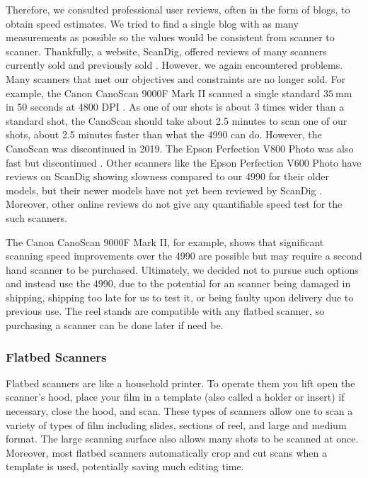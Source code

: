 \documentclass[12pt]{article} %
\begin{document}
Therefore, we consulted professional user reviews, often in the form of blogs, to obtain speed estimates. We tried to find a single blog with as many measurements as possible so the values would be consistent from scanner to scanner. Thankfully, a website, ScanDig, offered reviews of many scanners currently sold and previously sold \cite{ScanDig}. However, we again encountered problems. Many scanners that met our objectives and constraints are no longer sold. For example, the Canon CanoScan 9000F Mark II scanned a single standard $35 \ \text{mm}$ in 50 seconds at 4800 DPI \cite{canoscanspeed}. As one of our shots is about 3 times wider than a standard shot, the CanoScan should take about 2.5 minutes to scan one of our shots, about 2.5 minutes faster than what the 4990 can do. However, the CanoScan was discontinued in 2019. The Epson Perfection V800 Photo was also fast but discontinued \cite{v800scandig}. Other scanners like the Epson Perfection V600 Photo have reviews on ScanDig showing slowness compared to our 4990 for their older models, but their newer models have not yet been reviewed by ScanDig \cite{v600scandig}. Moreover, other online reviews do not give any quantifiable speed test for the such scanners.

The Canon CanoScan 9000F Mark II, for example, shows that significant scanning speed improvements over the 4990 are possible but may require a second hand scanner to be purchased. Ultimately, we decided not to pursue such options and instead use the 4990, due to the potential for an scanner being damaged in shipping, shipping too late for us to test it, or being faulty upon delivery due to previous use. The reel stands are compatible with any flatbed scanner, so purchasing a scanner can be done later if need be.

\subsubsection{Flatbed Scanners}
Flatbed scanners are like a household printer. To operate them you lift open the scanner’s hood, place your film in a  template (also called a holder or insert) if necessary, close the hood, and scan. These types of scanners allow one to scan a variety of types of film including slides, sections of reel, and large and medium format. The large scanning surface also allows many shots to be scanned at once. Moreover, most flatbed scanners automatically crop and cut scans when a template is used, potentially saving much editing time.
\end{document}
